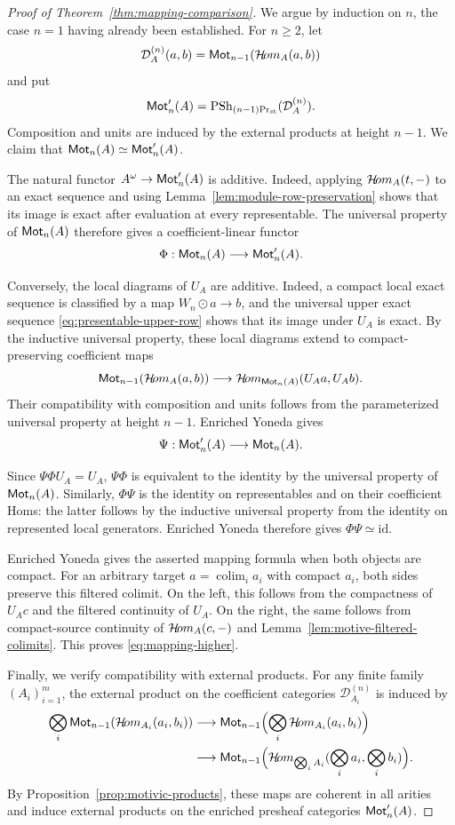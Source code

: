 \begin{proof}[{Proof of Theorem~\ref{thm:mapping-comparison}}]
We argue by induction on $n$, the case $n=1$
having already been established.
For $n\geq2$, let
\[
 \mathcal D_A^{(n)}(a,b)
 =\mathsf{Mot}_{n-1}(\mathcal{H}\!om_A(a,b))
\]
and put
\[
 \mathsf{Mot}'_n(A)=
 \operatorname{PSh}_{{(n-1)}\mathrm{Pr}_{\mathrm{st}}}(\mathcal D_A^{(n)}).
\]
Composition and units are induced by the external
products at height $n-1$.
We claim that \(\mathsf{Mot}_n(A)\simeq\mathsf{Mot}'_n(A)\).

The natural functor
$A^\omega\to\mathsf{Mot}'_n(A)$ is additive.
Indeed, applying $\mathcal{H}\!om_A(t,-)$ to an exact
sequence and using
Lemma~\ref{lem:module-row-preservation}
shows that its image is exact after evaluation
at every representable.
The universal property of $\mathsf{Mot}_n(A)$ therefore
gives a coefficient-linear functor
\[
 \Phi:\mathsf{Mot}_n(A)\longrightarrow\mathsf{Mot}'_n(A).
\]

Conversely, the local diagrams of $U_A$ are additive.
Indeed, a compact local exact sequence is classified
by a map $W_n\odot a\to b$, and the universal upper
exact sequence \eqref{eq:presentable-upper-row}
shows that its image under $U_A$ is exact.
By the inductive universal property, these
local diagrams extend to compact-preserving
coefficient maps
\[
 \mathsf{Mot}_{n-1}(\mathcal{H}\!om_A(a,b))
 \longrightarrow
 \mathcal{H}\!om_{\mathsf{Mot}_n(A)}(U_Aa,U_Ab).
\]
Their compatibility with composition and units
follows from the parameterized universal property
at height $n-1$. Enriched Yoneda gives
\[
 \Psi:\mathsf{Mot}'_n(A)\longrightarrow\mathsf{Mot}_n(A).
\]

Since \(\Psi\Phi U_A=U_A\), \(\Psi\Phi\) is
equivalent to the identity by the universal
property of $\mathsf{Mot}_n(A)$.
Similarly, $\Phi\Psi$ is the identity on
representables and on their coefficient Homs:
the latter follows by the inductive universal
property from the identity on represented
local generators.
Enriched Yoneda therefore gives
$\Phi\Psi\simeq\mathrm{id}$.


Enriched Yoneda gives the asserted mapping formula
when both objects are compact.
For an arbitrary target
$a=\operatorname*{colim}_i a_i$ with compact $a_i$,
both sides preserve this filtered colimit.
On the left, this follows from the compactness
of $U_Ac$ and the filtered continuity of $U_A$.
On the right, the same follows from
compact-source continuity of
$\mathcal{H}\!om_A(c,-)$ and
Lemma~\ref{lem:motive-filtered-colimits}.
This proves \eqref{eq:mapping-higher}.



Finally, we verify compatibility with external products.
For any finite family $(A_i)_{i=1}^m$, the external
product on the coefficient categories
$\mathcal D_{A_i}^{(n)}$ is induced by
\[
\begin{aligned}
 \bigotimes_i \mathsf{Mot}_{n-1}(\mathcal{H}\!om_{A_i}(a_i,b_i))
 &\longrightarrow
 \mathsf{Mot}_{n-1}\Bigl(
   \bigotimes_i\mathcal{H}\!om_{A_i}(a_i,b_i)\Bigr)\\
 &\longrightarrow
 \mathsf{Mot}_{n-1}\Bigl(
   \mathcal{H}\!om_{\bigotimes_i A_i}
   (\bigotimes_i a_i,\bigotimes_i b_i)\Bigr).
\end{aligned}
\]
By Proposition~\ref{prop:motivic-products},
these maps are coherent in all arities and induce
external products on the enriched presheaf categories
$\mathsf{Mot}'_n(A)$.


\end{proof}
